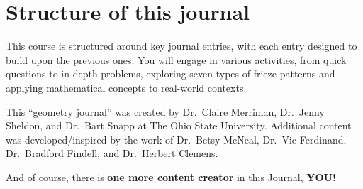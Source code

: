 \documentclass[handout,nooutcomes,noauthor]{ximera}
\begin{document}
\section{Structure of this journal}

This course is structured around key journal entries, with each entry designed to build upon the previous ones. You will engage in various activities, from quick questions to in-depth problems, exploring seven types of frieze patterns and applying mathematical concepts to real-world contexts.






This ``geometry journal'' was created by Dr.\ Claire Merriman,
Dr.\ Jenny Sheldon, and Dr.\ Bart Snapp at The Ohio State
University. Additional content was developed/inspired by the work of
Dr.\ Betsy McNeal, Dr.\ Vic Ferdinand, Dr.\ Bradford Findell, and
Dr.\ Herbert Clemens.


And of course, there is \textbf{one more
  content creator} in this Journal, \textbf{YOU!}
\end{document}
